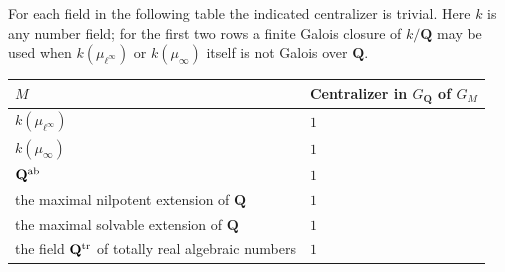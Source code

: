 \documentclass[11pt,a4paper]{article}
\begin{document}
For each field in the following table the indicated centralizer is trivial.
Here $k$ is any number field; for the first two rows a finite Galois closure
of $k/\mathbf Q$ may be used when $k(\mu_{\ell^\infty})$ or
$k(\mu_\infty)$ itself is not Galois over $\mathbf Q$.
\begin{center}
\begin{tabular}{ll}
\hline
$M$ & Centralizer in $G_{\mathbf Q}$ of $G_M$\\\hline
$k(\mu_{\ell^\infty})$ & $1$\\
$k(\mu_\infty)$ & $1$\\
$\mathbf Q^{\rm ab}$ & $1$\\
the maximal nilpotent extension of $\mathbf Q$ & $1$\\
the maximal solvable extension of $\mathbf Q$ & $1$\\
the field $\mathbf Q^{\rm tr}$ of totally real algebraic numbers & $1$\\\hline
\end{tabular}
\end{center}
\end{document}
